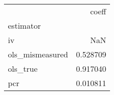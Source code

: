 \begin{tabular}{lr}
\toprule
{} &     coeff \\
estimator       &           \\
\midrule
iv              &       NaN \\
ols\_mismeasured &  0.528709 \\
ols\_true        &  0.917040 \\
pcr             &  0.010811 \\
\bottomrule
\end{tabular}
